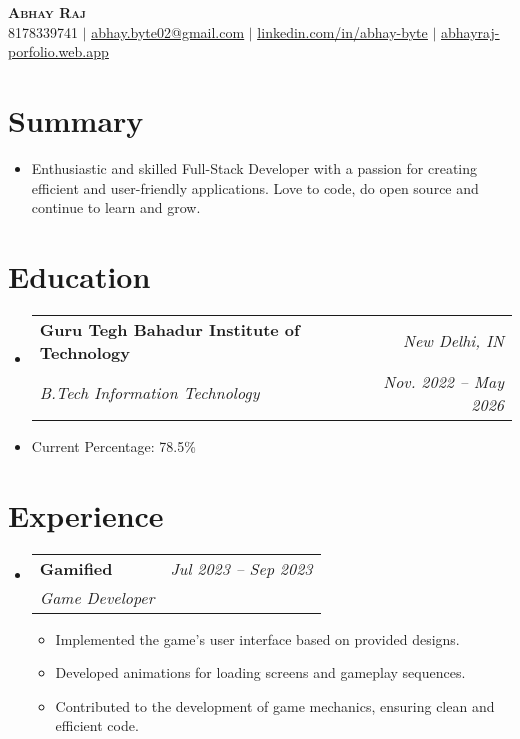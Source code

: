 \documentclass[letterpaper,11pt]{article}
\makeatletter
\newcommand{\resumeItem}[1]{
  \item\small{ %
    {#1 \vspace{-2pt}}
  }
}
\newcommand{\resumeSubheading}[4]{
  \vspace{-2pt}\item
  \begin{tabular*}{0.97\textwidth}[t]{l@{\extracolsep{\fill}}r}
    \textbf{#1} & \textit{\small #2} \\ %
    \textit{\small#3} & \textit{\small #4} \\ %
  \end{tabular*}\vspace{-7pt}
}
\newcommand{\resumeSubItem}[1]{\resumeItem{#1}\vspace{-4pt}} %
\newcommand{\resumeSubHeadingListStart}{\begin{itemize}[leftmargin=0.15in, label={}]}
\newcommand{\resumeSubHeadingListEnd}{\end{itemize}}
\newcommand{\resumeItemListStart}{\begin{itemize}}
\newcommand{\resumeItemListEnd}{\end{itemize}\vspace{-5pt}}
\makeatother
\begin{document}
\begin{center}
  \textbf{\Huge \scshape Abhay Raj} \\ \vspace{1pt} %
  \small 8178339741 $|$ \href{mailto:abhay.byte02@gmail.com}{\underline{abhay.byte02@gmail.com}} $|$ %
  \href{https://linkedin.com/in/abhay-byte}{\underline{linkedin.com/in/abhay-byte}} $|$
  \href{https://abhayraj-porfolio.web.app}{\underline{abhayraj-porfolio.web.app}}
\end{center}


\section{Summary}
  \resumeSubHeadingListStart
    \resumeItem{Enthusiastic and skilled Full-Stack Developer with a passion for creating efficient and user-friendly applications.  Love to code, do open source and continue to learn and grow.} %
  \resumeSubHeadingListEnd


\section{Education}
  \resumeSubHeadingListStart
    \resumeSubheading
      {Guru Tegh Bahadur Institute of Technology}{New Delhi, IN} %
      {B.Tech Information Technology}{Nov. 2022 -- May 2026} %
      \resumeSubItem{Current Percentage: 78.5\%} %
  \resumeSubHeadingListEnd


\section{Experience}
  \resumeSubHeadingListStart

    \resumeSubheading
      {Gamified}{Jul 2023 -- Sep 2023} %
      {Game Developer}{ } %
      \resumeItemListStart
        \resumeItem{Implemented the game's user interface based on provided designs.} %
        \resumeItem{Developed animations for loading screens and gameplay sequences.} %
        \resumeItem{Contributed to the development of game mechanics, ensuring clean and efficient code.} %
      \resumeItemListEnd

  \resumeSubHeadingListEnd
\end{document}

